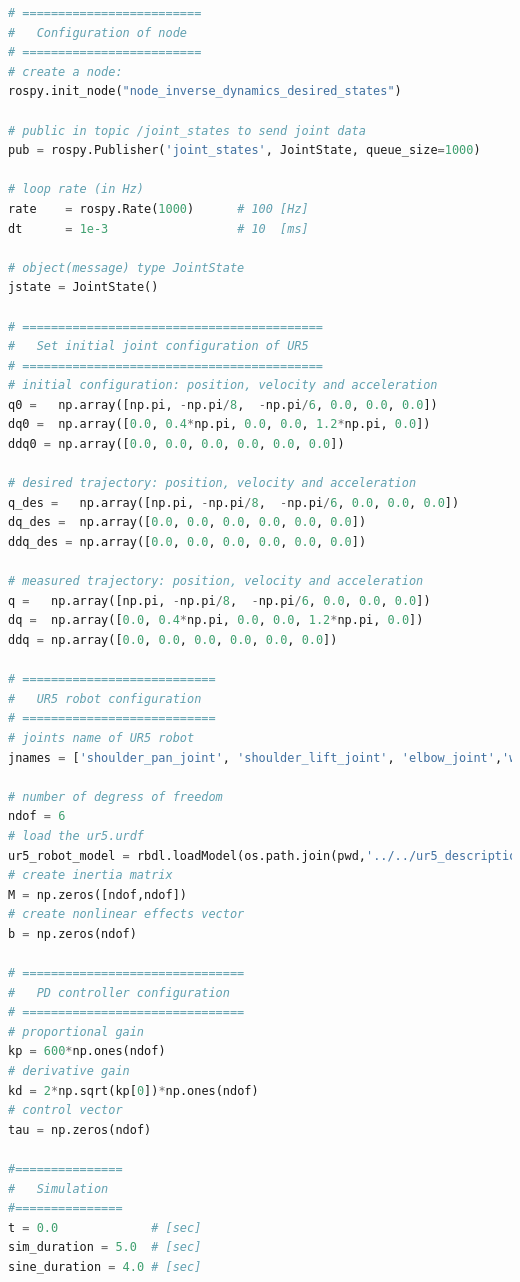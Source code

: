 \begin{lstlisting}[language=Python,caption={Move the second and fifth joint of UR5 robot with the required movement of activity 2.6.}, label={lst:inverse_dynamics_desired_states}]
# =========================
#   Configuration of node
# =========================
# create a node: 
rospy.init_node("node_inverse_dynamics_desired_states")

# public in topic /joint_states	to send joint data	
pub = rospy.Publisher('joint_states', JointState, queue_size=1000)

# loop rate (in Hz)
rate 	= rospy.Rate(1000)		# 100 [Hz]
dt 		= 1e-3					# 10  [ms]

# object(message) type JointState
jstate = JointState()

# ==========================================
#   Set initial joint configuration of UR5
# ==========================================
# initial configuration: position, velocity and acceleration 
q0 =   np.array([np.pi, -np.pi/8,  -np.pi/6, 0.0, 0.0, 0.0])
dq0 =  np.array([0.0, 0.4*np.pi, 0.0, 0.0, 1.2*np.pi, 0.0]) 
ddq0 = np.array([0.0, 0.0, 0.0, 0.0, 0.0, 0.0]) 

# desired trajectory: position, velocity and acceleration
q_des =   np.array([np.pi, -np.pi/8,  -np.pi/6, 0.0, 0.0, 0.0]) 
dq_des =  np.array([0.0, 0.0, 0.0, 0.0, 0.0, 0.0]) 
ddq_des = np.array([0.0, 0.0, 0.0, 0.0, 0.0, 0.0]) 

# measured trajectory: position, velocity and acceleration
q =   np.array([np.pi, -np.pi/8,  -np.pi/6, 0.0, 0.0, 0.0])
dq =  np.array([0.0, 0.4*np.pi, 0.0, 0.0, 1.2*np.pi, 0.0]) 
ddq = np.array([0.0, 0.0, 0.0, 0.0, 0.0, 0.0]) 

# ===========================
#   UR5 robot configuration
# ===========================
# joints name of UR5 robot
jnames = ['shoulder_pan_joint', 'shoulder_lift_joint', 'elbow_joint','wrist_1_joint', 'wrist_2_joint', 'wrist_3_joint']

# number of degress of freedom
ndof = 6
# load the ur5.urdf
ur5_robot_model = rbdl.loadModel(os.path.join(pwd,'../../ur5_description/urdf/v2_ur5.urdf'))
# create inertia matrix 
M = np.zeros([ndof,ndof])
# create nonlinear effects vector
b = np.zeros(ndof)

# ===============================
#   PD controller configuration
# ===============================
# proportional gain
kp = 600*np.ones(ndof)
# derivative gain
kd = 2*np.sqrt(kp[0])*np.ones(ndof)
# control vector
tau = np.zeros(ndof)    

#===============
#   Simulation
#===============
t = 0.0             # [sec] 
sim_duration = 5.0  # [sec]
sine_duration = 4.0 # [sec]


\end{lstlisting}

